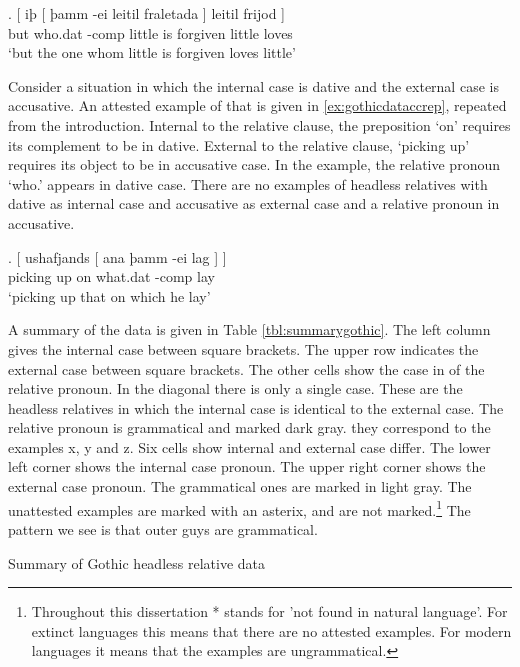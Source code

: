 \exg. [ iþ [ þamm -ei leitil fraletada ] leitil frijod ]\\
 {} but {} who.\ac{dat} -\ac{comp} little {is forgiven} \scsub{[dat]} little loves \scsub{[nom]}\\
 `but the one whom little is forgiven loves little' \label{ex:gothicdatnom}

Consider a situation in which the internal case is dative and the external case is accusative. An attested example of that is given in  \ref{ex:gothicdataccrep}, repeated from the introduction. Internal to the relative clause, the preposition  `on' requires its complement to be in dative. External to the relative clause,  `picking up' requires its object to be in accusative case. In the example, the relative pronoun  `who.' appears in dative case. There are no examples of headless relatives with dative as internal case and accusative as external case and a relative pronoun in accusative.

\ex. [ ushafjands [ ana þamm -ei lag ] ]\\
 {picking up} on what.\ac{dat} -\ac{comp} lay \scsub{[dat]} \scsub{[acc]}\\
 `picking up that on which he lay' \label{ex:gothicdataccrep}

A summary of the data is given in Table \ref{tbl:summarygothic}. The left column gives the internal case between square brackets. The upper row indicates the external case between square brackets.
The other cells show the case in of the relative pronoun. In the diagonal there is only a single case. These are the headless relatives in which the internal case is identical to the external case. The relative pronoun is grammatical and marked dark gray. they correspond to the examples x, y and z.
Six cells show internal and external case differ. The lower left corner shows the internal case pronoun. The upper right corner shows the external case pronoun. The grammatical ones are marked in light gray. The unattested examples are marked with an asterix, and are not marked.\footnote{
Throughout this dissertation * stands for 'not found in natural language'. For extinct languages this means that there are no attested examples. For modern languages it means that the examples are ungrammatical.
}
The pattern we see is that outer guys are grammatical.


\begin{table}[H]
  \center
  \caption {Summary of Gothic headless relative data}
    
    \label{tbl:summarygothic}
\end{table}


